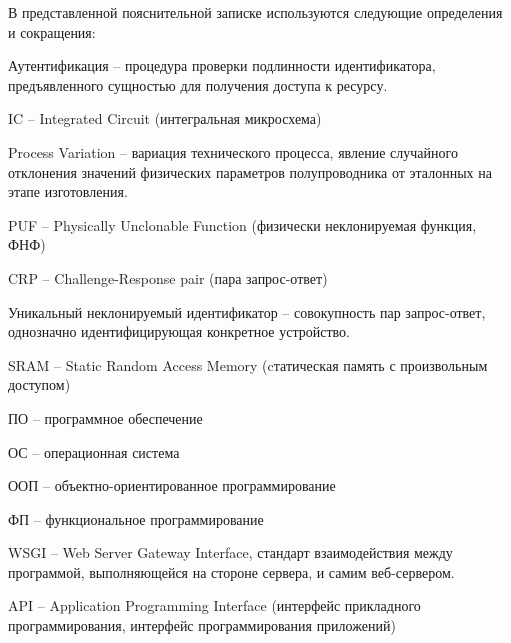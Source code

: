 
В представленной пояснительной записке используются следующие определения и сокращения:

Аутентификация -- процедура проверки подлинности идентификатора, предъявленного сущностью для получения доступа к ресурсу.

IC -- Integrated Circuit (интегральная микросхема)

Process Variation -- вариация технического процесса, явление случайного отклонения значений физических параметров полупроводника от эталонных на этапе изготовления.

PUF -- Physically Unclonable Function (физически неклонируемая функция, ФНФ)

CRP -- Challenge-Response pair (пара запрос-ответ)

Уникальный неклонируемый идентификатор -- совокупность пар запрос-ответ, однозначно идентифицирующая конкретное устройство.

SRAM -- Static Random Access Memory (cтатическая память с произвольным доступом)

ПО -- программное обеспечение

ОС -- операционная система

ООП -- объектно-ориентированное программирование

ФП -- функциональное программирование

WSGI -- Web Server Gateway Interface, стандарт взаимодействия между программой, выполняющейся на стороне сервера, и самим веб-сервером.

API -- Application Programming Interface (интерфейс прикладного программирования, интерфейс программирования приложений)


\clearpage
